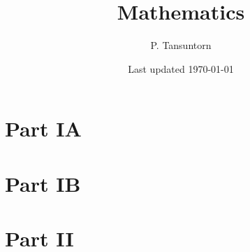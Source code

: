 \documentclass[12pt]{book}
\title{\textbf{Mathematics}}
\author{P. Tansuntorn}
\date{Last updated \today}
\theoremstyle{definition}
\theoremstyle{remark}
\begin{document}
	\frontmatter
	\pagestyle{plain}
	\maketitle
	\tableofcontents
	
	\pagestyle{fancy}
		\fancyhf{}%
		\fancyhead[RO,LE]{\thepage}
		\fancyhead[CO]{\textit{\rightmark}}
		\fancyhead[CE]{\textit{\leftmark}}
		\renewcommand{\headrulewidth}{0pt}
		\renewcommand{\headrulewidth}{0pt}
	
	\mainmatter
	\part{Part IA}
		
		
		
		
		
		
		
		
	\part{Part IB}
		
		
		
		
				
		
		
		
	
	\part{Part II}
		
		
		
		
		
		
		
		
		
		
		
		
		
		
		
		

	\backmatter
		\printindex
		
\end{document}
